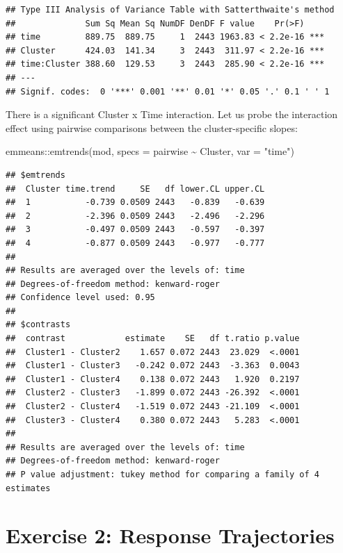 \documentclass[
]{book}
\newenvironment{Shaded}{\begin{snugshade}}{\end{snugshade}}
\newcommand{\AttributeTok}[1]{\textcolor[rgb]{0.77,0.63,0.00}{#1}}
\newcommand{\FunctionTok}[1]{\textcolor[rgb]{0.00,0.00,0.00}{#1}}
\newcommand{\NormalTok}[1]{#1}
\newcommand{\SpecialCharTok}[1]{\textcolor[rgb]{0.00,0.00,0.00}{#1}}
\newcommand{\StringTok}[1]{\textcolor[rgb]{0.31,0.60,0.02}{#1}}
\begin{document}
\begin{verbatim}
## Type III Analysis of Variance Table with Satterthwaite's method
##              Sum Sq Mean Sq NumDF DenDF F value    Pr(>F)    
## time         889.75  889.75     1  2443 1963.83 < 2.2e-16 ***
## Cluster      424.03  141.34     3  2443  311.97 < 2.2e-16 ***
## time:Cluster 388.60  129.53     3  2443  285.90 < 2.2e-16 ***
## ---
## Signif. codes:  0 '***' 0.001 '**' 0.01 '*' 0.05 '.' 0.1 ' ' 1
\end{verbatim}

There is a significant Cluster x Time interaction. Let us probe the interaction effect using pairwise comparisons between the cluster-specific slopes:

\begin{Shaded}
\begin{Highlighting}[]
\NormalTok{emmeans}\SpecialCharTok{::}\FunctionTok{emtrends}\NormalTok{(mod, }\AttributeTok{specs =}\NormalTok{ pairwise }\SpecialCharTok{\textasciitilde{}}\NormalTok{ Cluster, }\AttributeTok{var =} \StringTok{"time"}\NormalTok{)}
\end{Highlighting}
\end{Shaded}

\begin{verbatim}
## $emtrends
##  Cluster time.trend     SE   df lower.CL upper.CL
##  1           -0.739 0.0509 2443   -0.839   -0.639
##  2           -2.396 0.0509 2443   -2.496   -2.296
##  3           -0.497 0.0509 2443   -0.597   -0.397
##  4           -0.877 0.0509 2443   -0.977   -0.777
## 
## Results are averaged over the levels of: time 
## Degrees-of-freedom method: kenward-roger 
## Confidence level used: 0.95 
## 
## $contrasts
##  contrast            estimate    SE   df t.ratio p.value
##  Cluster1 - Cluster2    1.657 0.072 2443  23.029  <.0001
##  Cluster1 - Cluster3   -0.242 0.072 2443  -3.363  0.0043
##  Cluster1 - Cluster4    0.138 0.072 2443   1.920  0.2197
##  Cluster2 - Cluster3   -1.899 0.072 2443 -26.392  <.0001
##  Cluster2 - Cluster4   -1.519 0.072 2443 -21.109  <.0001
##  Cluster3 - Cluster4    0.380 0.072 2443   5.283  <.0001
## 
## Results are averaged over the levels of: time 
## Degrees-of-freedom method: kenward-roger 
## P value adjustment: tukey method for comparing a family of 4 estimates
\end{verbatim}

\hypertarget{exercise-2-response-trajectories}{%
\section{Exercise 2: Response Trajectories}\label{exercise-2-response-trajectories}}
\end{document}
